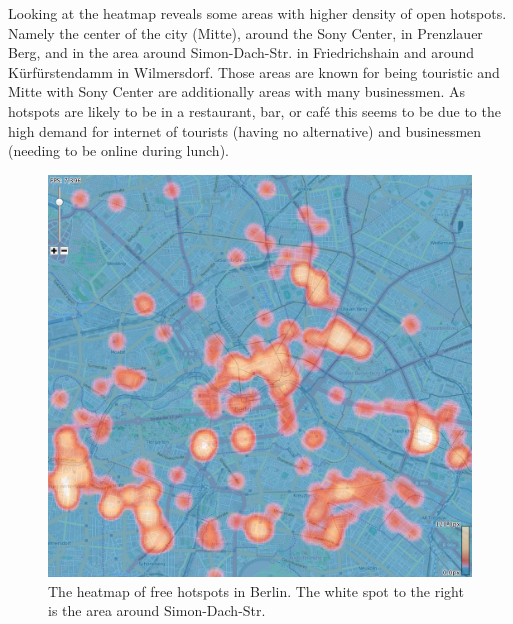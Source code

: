 Looking at the heatmap reveals some areas with higher density of open hotspots.
Namely the center of the city (Mitte), around the Sony Center, in Prenzlauer Berg, and
in the area around Simon-Dach-Str. in Friedrichshain and around Kürfürstendamm in Wilmersdorf.
Those areas are known for being touristic and Mitte with Sony Center are additionally
areas with many businessmen.
As hotspots are likely to be in a restaurant, bar, or caf\'{e}
this seems to be due to the high demand for internet
of tourists (having no alternative) and businessmen (needing to
be online during lunch).

\begin{figure}
\centering
\includegraphics[width=0.9\linewidth]{imgs/heat}
\caption{The heatmap of free hotspots in Berlin.
The white spot to the right is the area around Simon-Dach-Str.}
\label{fig:heat}
\end{figure}
